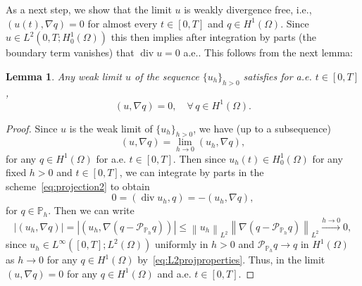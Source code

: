 \documentclass[10pt,letterpaper]{amsart}
\newcommand\norm[1]{\left\lVert#1\right\rVert}
\newcommand{\Grad}{\nabla}
\newcommand{\Div}{\operatorname{div}}
\newcommand{\dom}{\Omega}
\newcommand{\Ph}{\mathbb{P}_h}
\newcommand{\PPh}{\mathcal{P}_{\Ph}}
\newtheorem{lemma}{Lemma}[section]
\theoremstyle{definition}{\newtheorem{definition}[lemma]{Definition}}
\numberwithin{equation}{section}
\begin{document}
As a next step, we show that the limit $u$ is weakly divergence free, i.e., $(u(t),\Grad q)=0$ for almost every $t\in [0,T]$ and $q\in H^1(\dom)$. Since $u\in L^2(0,T;H^1_0(\dom))$ this then implies after integration by parts (the boundary term vanishes) that $\Div u=0$ a.e.. This follows from the next lemma:
\begin{lemma}\label{lem:divfree2}
	Any weak limit $u$ of the sequence $\{u_h\}_{h>0}$ satisfies for a.e. $t\in [0,T]$,
	\begin{equation*}
		(u,\Grad q) = 0,\quad \forall \, q\in H^1(\dom).
	\end{equation*}
	
\end{lemma}
\begin{proof}
	Since $u$ is the weak limit of $\{{u}_h\}_{h>0}$, we have (up to a subsequence)
	\begin{equation*}
		(u,\Grad q) = \lim_{h\to 0} ({u}_h,\Grad q),
	\end{equation*}
	for any $q\in H^1(\dom)$ for a.e. $t\in [0,T]$. Then since ${u}_h(t)\in H^1_0(\dom)$ for any fixed $h>0$ and $t\in [0,T]$, we can integrate by parts in the scheme~\eqref{eq:projection2} to obtain
	\begin{equation}\label{eq:weakapproxdivfree}
		0=(\Div {u}_h,q) = -({u}_h,\Grad q),
	\end{equation}
	for $q\in \Ph$.
	Then we can write
	\begin{equation*}
		|({u}_h ,\Grad q)| = 	|({u}_h ,\Grad (q-\PPh q)) |\leq \norm{{u}_h}_{L^2}\norm{\Grad (q-\PPh q)}_{L^2}\stackrel{h\to 0}{\longrightarrow} 0,
	\end{equation*}
	since ${u}_h\in L^\infty([0,T];L^2(\dom))$ uniformly in $h>0$ and $\PPh q \to q$ in $H^1(\dom)$ as $h\to 0$ for any $q\in H^1(\dom)$ by~\eqref{eq:L2projproperties}. Thus, in the limit $(u,\Grad q) = 0$ for any $q\in H^1(\dom)$ and a.e. $t\in [0,T]$.
\end{proof}
\end{document}
